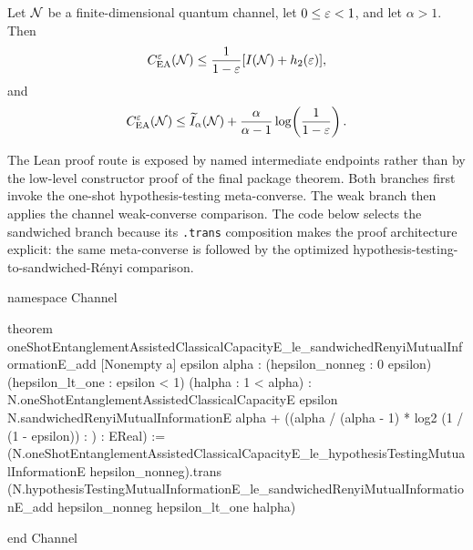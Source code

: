 \documentclass[10pt,a4paper]{article}
\newif\ifqitLineFocused
\newcommand{\qitHighlightSpan}[2]{%
	\ifnum\value{lstnumber}<#1\relax
	\else
		\ifnum\value{lstnumber}>#2\relax
		\else
			\qitLineFocusedtrue
		\fi
	\fi
}
\begin{document}
	\begin{theorem}
		\label{thm:ea-one-shot-converse}
		Let ${\cal N}$ be a finite-dimensional quantum channel, let
		$0\le\varepsilon<1$, and let $\alpha>1$.  Then
		\begin{equation}
			C_{\operatorname{EA}}^{\varepsilon}({\cal N})
			\le
			\frac{1}{1-\varepsilon}[I({\cal N})+h_2(\varepsilon)],
		\end{equation}
		and
		\begin{equation}
			C_{\operatorname{EA}}^{\varepsilon}({\cal N})\le
			\widetilde I_{\alpha}({\cal N})+\frac{\alpha}{\alpha-1}\log\!\left(\frac{1}{1-\varepsilon}\right).
		\end{equation}
	\end{theorem}
	
	The Lean proof route is exposed by named intermediate endpoints rather than by
	the low-level constructor proof of the final package theorem.  Both branches
	first invoke the one-shot hypothesis-testing meta-converse.  The weak branch
	then applies the channel weak-converse comparison.  The code below selects the
	sandwiched branch because its \texttt{.trans} composition makes the proof
	architecture explicit: the same meta-converse is followed by the optimized
	hypothesis-testing-to-sandwiched-R\'enyi comparison.
	
\begin{qitleancode}[title={Sandwiched-R\'enyi one-shot converse},
qit focus={\qitHighlightSpan{7}{13}}]
namespace Channel

theorem oneShotEntanglementAssistedClassicalCapacityE_le_sandwichedRenyiMutualInformationE_add
    [Nonempty a] {epsilon alpha : \mathbbR}
    (hepsilon_nonneg : 0 \le epsilon) (hepsilon_lt_one : epsilon < 1)
    (halpha : 1 < alpha) :
    N.oneShotEntanglementAssistedClassicalCapacityE epsilon \le
      N.sandwichedRenyiMutualInformationE alpha +
        ((alpha / (alpha - 1) * log2 (1 / (1 - epsilon)) : \mathbbR) : EReal) :=
  (N.oneShotEntanglementAssistedClassicalCapacityE_le_hypothesisTestingMutualInformationE
    hepsilon_nonneg).trans
    (N.hypothesisTestingMutualInformationE_le_sandwichedRenyiMutualInformationE_add
      hepsilon_nonneg hepsilon_lt_one halpha)

end Channel
\end{qitleancode}
	
\end{document}

